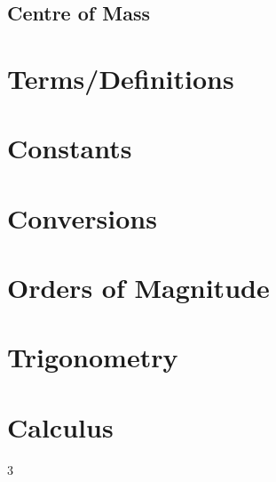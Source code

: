 \documentclass[letterpaper,10pt]{article}
\begin{document}
\begin{multicols}{2}
\subsection{Centre of Mass}

\appendix
\section{Terms/Definitions}

\section{Constants}

\section{Conversions}

\section{Orders of Magnitude}

\section{Trigonometry}

\section{Calculus}

\end{multicols}{3}
\end{document}
